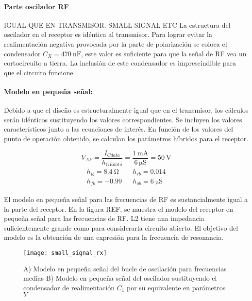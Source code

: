 \paragraph{Parte oscilador RF} IGUAL QUE EN TRANSMISOR. SMALL-SIGNAL ETC 
La estructura del oscilador en el receptor es idéntica al transmisor. Para lograr evitar la realimentación negativa provocada por la parte de polarización se coloca el condensador $C_X = \SI{470}{\nano\farad}$, este valor es suficiente para que la señal de RF vea un cortocircuito a tierra. La inclusión de este condensador es imprescindible para que el circuito funcione. 
\paragraph{Modelo en pequeña señal:} Debido a que el diseño es estructuralmente igual que en el transmisor, los cálculos serán idénticos sustituyendo los valores correspondientes.
Se incluyen los valores característicos junto a las ecuaciones de interés.
En función de los valores del punto de operación obtenido, se calculan los parámetros híbridos para el receptor.

\begin{equation}
   \label{eq:result_pol1}
V_{AF} = \frac{I_{Cdata}}{h_{OEdata}} =\frac{\SI{1}{\milli\ampere}}{\SI{6}{\micro\siemens}} =  \SI{50}{\volt} 
\end{equation}
\begin{equation}
   \label{eq:result_pol2}
\begin{array}{rl} 
      \begin{array}{l}
	 h_{ib} =  \SI{8.4}{\ohm} \\
	 h_{fb} =  -0.99
      \end{array}
      &
      \begin{array}{l}
	 h_{rb} =  0.014 \\
	 h_{ob} =  \SI{6}{\micro\siemens}
      \end{array}
\end{array}
\end{equation}

El modelo en pequeña señal para las frecuencias de RF es sustancialmente igual a la parte del receptor. En la figura REF, se muestra el modelo del receptor en pequeña señal para las frecuencias de RF. L2 tiene una impedancia suficientemente grande como para considerarla circuito abierto. El objetivo del modelo es la obtención de una expresión para la frecuencia de resonancia.

\begin{figure}[h]
    \centering
    \texttt{[image: small\_signal\_rx]}
    \caption{A) Modelo en pequeña señal del bucle de oscilación para frecuencias medias B) Modelo en pequeña señal del oscilador sustituyendo el condensador de realimentación $C_1$ por su equivalente en parámetros $Y$}
    \label{fig:ss_rx}
\end{figure}

